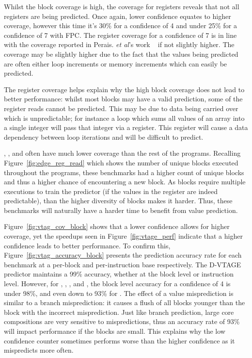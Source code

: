 Whilst the block coverage is high, the coverage for registers reveals that not all registers are being predicted.
Once again, lower confidence equates to higher coverage, however this time it's 30\% for a confidence of 4 and under 25\% for a confidence of 7 with FPC.
The register coverage for a confidence of 7 is in line with the coverage reported in Perais. {\it et al}'s work ~\cite{peraisBeBop2015, peraisVTAGE2014} if not slightly higher.
The coverage may be slightly higher due to the fact that the values being predicted are often either loop increments or memory increments which can easily be predicted.

The register coverage helps explain why the high block coverage does not lead to better performance: whilst most blocks may have a valid prediction, some of the register reads cannot be predicted.
This may be due to data being carried over which is unpredictable; for instance a loop which sums all values of an array into a single integer will pass that integer via a register.
This register will cause a data dependency between loop iterations and will be difficult to predict.


, ,  and  often have much lower coverage than the rest of the programs.
Recalling Figure~\ref{fig:edge_reg_read} which shows the number of unique blocks executed throughout the programs, these benchmarks had a higher count of unique blocks and thus a higher chance of encountering a new block.
As blocks require multiple executions to train the predictor (if the values in the register are indeed predictable), than the higher diversity of blocks makes it harder.
Thus, these benchmarks will naturally have a harder time to benefit from value prediction.

Figure~\ref{fig:vtag_cov_block} shows that a lower confidence allows for higher coverage, yet the speedups seen in Figure~\ref{fig:vtage_perf} indicate that a higher confidence leads to better performance.
To confirm this, Figure~\ref{fig:vtag_accuracy_block} presents the prediction accuracy rate for each benchmark at a per-block and per-instruction base respectively.
The D-VTAGE predictor maintains a 99\% accuracy, whether at the block level or instruction level.
However, for , , ,  and , the block level accuracy for a confidence of 4 is under 98\%, and even down to 93\% for .
The effect of a value misprediction is similar to a branch misprediction: it causes a flush of all blocks younger than the block with the incorrect misprediction.
Just like branch prediction, large core compositions are very sensitive to mispredictions, thus an accuracy rate of 93\% will impact performance if the blocks are small.
This explains why the low confidence counter sometimes performs worse than the higher confidence as it mispredicts more often.
\vspace{-1em}

